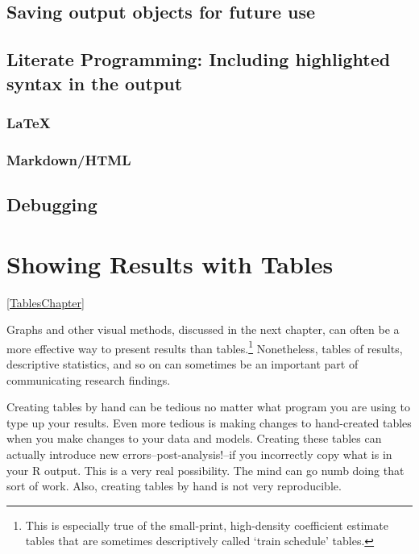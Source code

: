 \documentclass[ChapterTOCs,krantz1]{krantz}\usepackage{graphicx, color}
\begin{document}
\section{Saving output objects for future use}

\section{Literate Programming: Including highlighted syntax in the output}

\subsection{\LaTeX}

\subsection{Markdown/HTML}

\section{Debugging}





\chapter{Showing Results with Tables}\ref{TablesChapter}

Graphs and other visual methods, discussed in the next chapter, can
often be a more effective way to present results than tables.\footnote{This
  is especially true of the small-print, high-density coefficient
  estimate tables that are sometimes descriptively called `train
  schedule' tables.} Nonetheless, tables of results, descriptive statistics,
and so on can sometimes be an important part of communicating
research findings.

Creating tables by hand can be tedious no matter what program you are
using to type up your results. Even more tedious is making changes to
hand-created tables when you make changes to your data and models.
Creating these tables can actually introduce new
errors--post-analysis!--if you incorrectly copy what is in your
R output. This is a very real possibility. The mind can go numb
doing that sort of work. Also, creating tables by hand is not very
reproducible.
\end{document}
